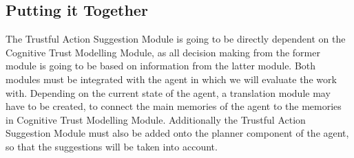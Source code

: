 \subsection{Putting it Together}
The Trustful Action Suggestion Module is going to be directly dependent on the Cognitive Trust Modelling Module, as all decision making from the former module is going to be based on information from the latter module.
Both modules must be integrated with the agent in which we will evaluate the work with. Depending on the current state of the agent, a translation module may have to be created, to connect the main memories of the agent to the memories in Cognitive Trust Modelling Module. Additionally the Trustful Action Suggestion Module must also be added onto the planner component of the agent, so that the suggestions will be taken into account.